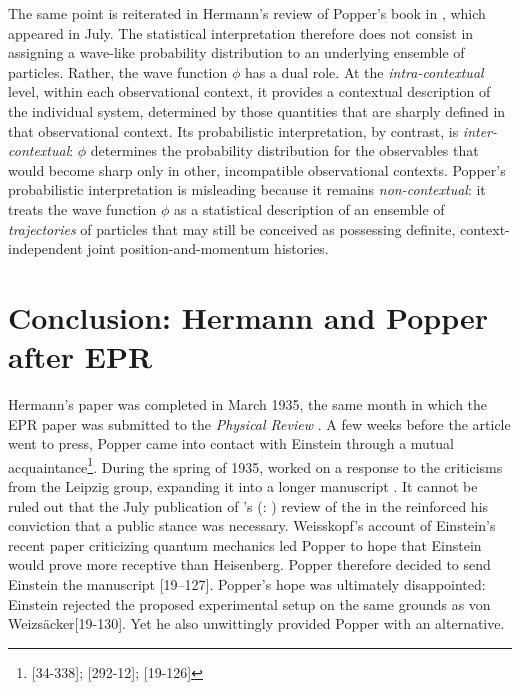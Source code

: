 \documentclass[pdflatex]{sn-jnl}
\renewcommand{\citets}[2][]{\citeauthor{#2}'s (\citeyear{#2}\if\relax\detokenize{#1}\relax\else: #1\fi)}
\newcommand{\Lo}{\bt{Logik}\xspace}
\newcommand{\vW}{von Weizsäcker\xspace}
\newcommand{\OC}{observational context\xspace}
\begin{document}
%
The same point is reiterated in Hermann’s review of Popper’s book in , which appeared in July. The statistical interpretation therefore does not consist in assigning a wave-like probability distribution to an underlying ensemble of particles. Rather, the wave function $\phi$ has a dual role. At the \emph{intra-contextual} level, within each \OC, it provides a contextual description of the individual system, determined by those quantities that are sharply defined in that observational context. Its probabilistic interpretation, by contrast, is \emph{inter-contextual}: $\phi$ determines the probability distribution for the observables that would become sharp only in other, incompatible \OC{}s. Popper’s probabilistic interpretation is misleading because it remains \emph{non-contextual}: it treats the wave function $\phi$ as a statistical description of an ensemble of \emph{trajectories} of particles that may still be conceived as possessing definite, context-independent joint position-and-momentum histories.

\section{Conclusion: Hermann and Popper after EPR}

Hermann’s paper was completed in March 1935, the same month in which the EPR paper was submitted to the \emph{Physical Review} \citep{Einstein1935}. A few weeks before the article went to press, Popper came into contact with Einstein through a mutual acquaintance\footnote{[34-338]; [292-12]; [19-126]}. During the spring of 1935, worked on a response to the criticisms from the Leipzig group, expanding it into a longer manuscript \citep{Popper1935b}. It cannot be ruled out that the July publication of \citets{Hermann1935a} review of the \Lo in the  reinforced his conviction that a public stance was necessary. Weisskopf’s account of Einstein’s recent paper criticizing quantum mechanics led Popper to hope that Einstein would prove more receptive than Heisenberg. Popper therefore decided to send Einstein the manuscript [19--127]. Popper's hope was ultimately disappointed: Einstein rejected the proposed experimental setup on the same grounds as \vW {}[19-130]. Yet he also unwittingly provided Popper with an alternative.
\end{document}
